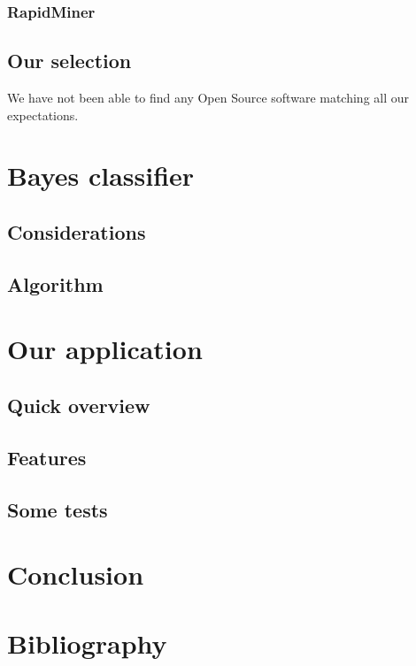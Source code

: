 \documentclass[a4paper,11pt]{article}
\begin{document}
\subsubsection{RapidMiner}

\subsection{Our selection}

We have not been able to find any Open Source software matching all our
expectations.


\section{Bayes classifier}

\subsection{Considerations}
\subsection{Algorithm}


\section{Our application}
\subsection{Quick overview}
\subsection{Features}
\subsection{Some tests}
    


\section*{Conclusion}


\clearpage
\section*{Bibliography}
\end{document}
